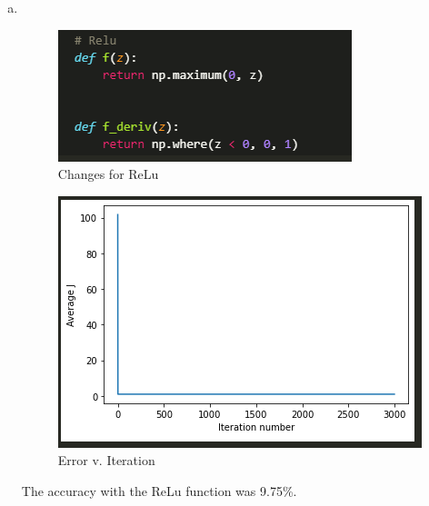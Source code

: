 \documentclass[12pt]{article}
\begin{document}
\begin{enumerate}[(a)]
	\item \,
		\begin{figure}[H]
			\centering
			\includegraphics[width=\textwidth/2]{images/7bchange.png}
			\caption{Changes for ReLu}
			\label{fig:7:b:change}
		\end{figure}
		\begin{figure}[H]
			\centering
			\includegraphics[height=\textwidth/2]{images/7bgraph.png}
			\caption{Error v. Iteration}
			\label{fig:7:b:J}
		\end{figure}
		The accuracy with the ReLu function was 9.75\%.
		

\end{enumerate}
\end{document}
